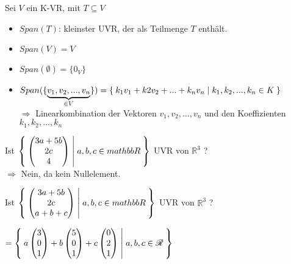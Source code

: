 \documentclass{../tudscript}
\begin{document}
Sei \(V\) ein K-VR, mit \(T \subseteq V\)

\begin{center}
\end{center}

\begin{itemize}
\tightlist
\item
  \(Span(T)\): kleinster UVR, der als Teilmenge \(T\) enthält.
\item
  \(Span(V) = V\)
\item
  \(Span(\emptyset) = \{0_V\}\)
\item
  \(Span(\{\underbrace{v_1, v_2, ..., v_n}_{\in V}\}) = \Set{k_1v_1 + k2v_2 + ... + k_nv_n | k_1,k_2,...,k_n \in K}\)\\
  \(\Rightarrow\) Linearkombination der Vektoren \(v_1, v_2, ..., v_n\)
  und den Koeffizienten \(k_1, k_2, ..., k_n\)
\end{itemize}

\hypertarget{beispiel}{%
\label{beispiel}}

Ist
\(\Set{\begin{pmatrix}3a + 5b\\2c\\4\end{pmatrix}| a,b,c \in mathbb{R}}\)
UVR von \(\mathbb{R}^3\) ?\\
\(\Rightarrow\) Nein, da kein Nullelement.

Ist
\(\Set{\begin{pmatrix}3a + 5b\\2c\\a+b+c\end{pmatrix}| a,b,c \in mathbb{R}}\)
UVR von \(\mathbb{R}^3\) ?

\(=\Set{a \begin{pmatrix}3\\0\\1\end{pmatrix} + b \begin{pmatrix}5\\0\\1\end{pmatrix} + c \begin{pmatrix}0\\2\\1\end{pmatrix} |  a,b,c \in \mathscr{R}}\)
\end{document}
